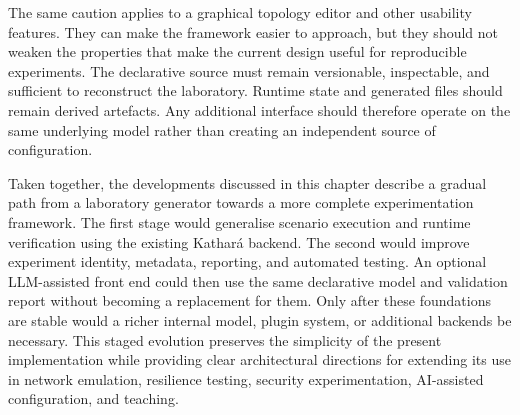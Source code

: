 The same caution applies to a graphical topology editor and other usability
features. They can make the framework easier to approach, but they should not
weaken the properties that make the current design useful for reproducible
experiments. The declarative source must remain versionable, inspectable, and
sufficient to reconstruct the laboratory. Runtime state and generated files
should remain derived artefacts. Any additional interface should therefore
operate on the same underlying model rather than creating an independent source
of configuration.

Taken together, the developments discussed in this chapter describe a gradual
path from a laboratory generator towards a more complete experimentation
framework. The first stage would generalise scenario execution and runtime
verification using the existing Kathar\'a backend. The second would improve
experiment identity, metadata, reporting, and automated testing. An optional
LLM-assisted front end could then use the same declarative model and validation
report without becoming a replacement for them. Only after these foundations
are stable would a richer internal model, plugin system, or additional backends
be necessary. This staged evolution preserves the simplicity of the present
implementation while providing clear architectural directions for extending its
use in network emulation, resilience testing, security experimentation,
AI-assisted configuration, and teaching.
